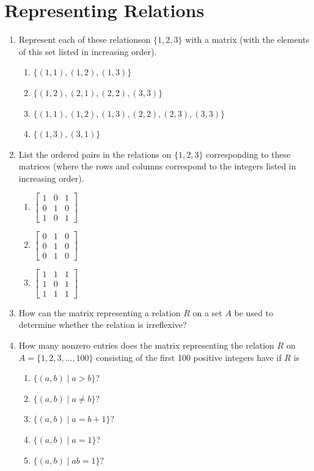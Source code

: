 \documentclass{sig-alternate-05-2015}
\begin{document}
\section{Representing Relations}
\begin{enumerate}
\item Represent each of these relationson $\{1, 2, 3\}$ with a matrix (with the elements of this set listed in increasing order).
\begin{enumerate}
	\item $\{(1, 1), (1, 2), (1, 3)\}$ 
	\item $\{(1, 2), (2, 1), (2, 2), (3, 3)\}$
	\item $\{(1, 1), (1, 2), (1, 3), (2, 2), (2, 3), (3, 3)\}$ 
	\item $\{(1, 3), (3, 1)\}$
\end{enumerate}

\item List the ordered pairs in the relations on $\{1, 2, 3\}$ corresponding to these matrices (where the rows and columns
correspond to the integers listed in increasing order).
\begin{enumerate}
	\item $\begin{bmatrix}
		1 & 0 & 1\\
		0 & 1 & 0\\
		1 & 0 & 1
	\end{bmatrix}$
	
	\item $\begin{bmatrix}
		0 & 1 & 0\\
		0 & 1 & 0\\
		0 & 1 & 0
	\end{bmatrix}$
	\item $\begin{bmatrix}
		1 & 1 & 1\\
		1 & 0 & 1\\
		1 & 1 & 1
	\end{bmatrix}$
\end{enumerate}

\item How can the matrix representing a relation $R$ on a set $A$
be used to determine whether the relation is irreflexive?

\item How many nonzero entries does the matrix representing
the relation $R$ on $A = \{1, 2, 3, ..., 100\}$ consisting of the
first 100 positive integers have if $R$ is \begin{enumerate}
	\item $\{(a, b) \mid a > b\}$?
	\item $\{(a, b) \mid a \ne b\}$?
	\item $\{(a, b) \mid a = b + 1\}$?
	\item $\{(a, b) \mid a = 1\}$?
	\item $\{(a, b) \mid ab = 1\}$?
\end{enumerate}


\end{enumerate}
\end{document}
